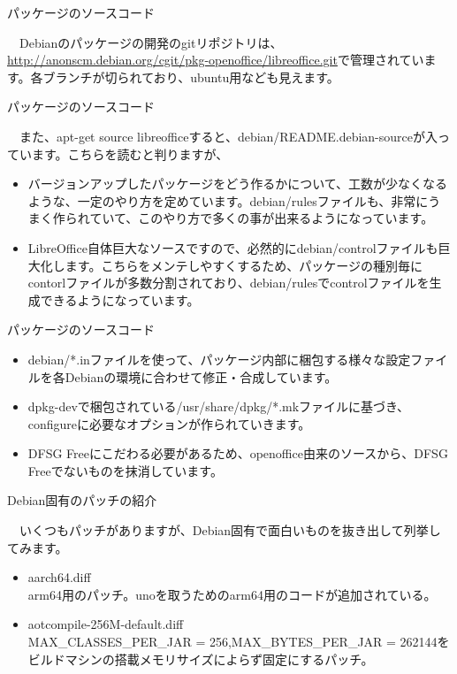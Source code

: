 \begin{frame}{パッケージのソースコード}

　Debianのパッケージの開発のgitリポジトリは、\url{http://anonscm.debian.org/cgit/pkg-openoffice/libreoffice.git}で管理されています。各ブランチが切られており、ubuntu用なども見えます。

\end{frame}

\begin{frame}{パッケージのソースコード}

　また、apt-get source libreofficeすると、debian/README.debian-sourceが入っています。こちらを読むと判りますが、

\begin{itemize}
\item バージョンアップしたパッケージをどう作るかについて、工数が少なくなるような、一定のやり方を定めています。debian/rulesファイルも、非常にうまく作られていて、このやり方で多くの事が出来るようになっています。
\item LibreOffice自体巨大なソースですので、必然的にdebian/controlファイルも巨大化します。こちらをメンテしやすくするため、パッケージの種別毎にcontorlファイルが多数分割されており、debian/rulesでcontrolファイルを生成できるようになっています。
\end{itemize}

\end{frame}

\begin{frame}{パッケージのソースコード}

\begin{itemize}
\item debian/*.inファイルを使って、パッケージ内部に梱包する様々な設定ファイルを各Debianの環境に合わせて修正・合成しています。
\item dpkg-devで梱包されている/usr/share/dpkg/*.mkファイルに基づき、configureに必要なオプションが作られていきます。
\item DFSG Freeにこだわる必要があるため、openoffice由来のソースから、DFSG Freeでないものを抹消しています。
\end{itemize}

\end{frame}

\begin{frame}{Debian固有のパッチの紹介}

　いくつもパッチがありますが、Debian固有で面白いものを抜き出して列挙してみます。

 \begin{itemize}
  \item aarch64.diff \\
    arm64用のパッチ。unoを取うためのarm64用のコードが追加されている。
  \item aotcompile-256M-default.diff \\
    MAX\_CLASSES\_PER\_JAR = 256,MAX\_BYTES\_PER\_JAR = 262144をビルドマシンの搭載メモリサイズによらず固定にするパッチ。
 \end{itemize}

\end{frame}

